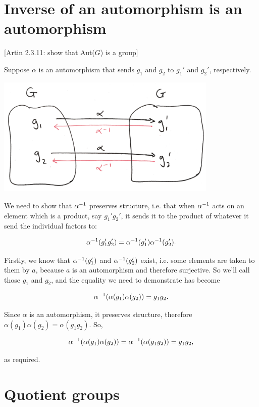 \section{Inverse of an automorphism is an automorphism}

[Artin 2.3.11: show that Aut($G$) is a group]

Suppose $\alpha$ is an automorphism that sends $g_1$ and $g_2$ to $g_1'$ and
$g_2'$, respectively.

\begin{mdframed}
\includegraphics[width=300pt]{img/inverse-of-automorphism-1.png}
\end{mdframed}

We need to show that $\alpha^{-1}$ preserves structure, i.e. that when $\alpha^{-1}$ acts
on an element which is a product, say $g_1'g_2'$, it sends it to the product of
whatever it send the individual factors to:

$$
\alpha^{-1}(g_1'g_2') = \alpha^{-1}(g_1')\alpha^{-1}(g_2').
$$


Firstly, we know that $\alpha^{-1}(g_1')$ and $\alpha^{-1}(g_2')$ exist, i.e. some elements
are taken to them by $a$, because $a$ is an automorphism and therefore
surjective. So we'll call those $g_1$ and $g_2$, and the equality we need to
demonstrate has become

$$
\alpha^{-1}(\alpha(g_1)\alpha(g_2)) = g_1g_2.
$$

Since $\alpha$ is an automorphism, it preserves structure, therefore
$\alpha(g_1)\alpha(g_2) = \alpha(g_1g_2)$. So,

$$
\alpha^{-1}(\alpha(g_1)\alpha(g_2)) = \alpha^{-1}(\alpha(g_1g_2)) = g_1g_2,
$$

as required.
\newcommand{\textstack}[2]{
  \left(\begin{array}{c}
    \text{#1}  \\
    \text{#2}
  \end{array}\right)
}

\section{Quotient groups}

